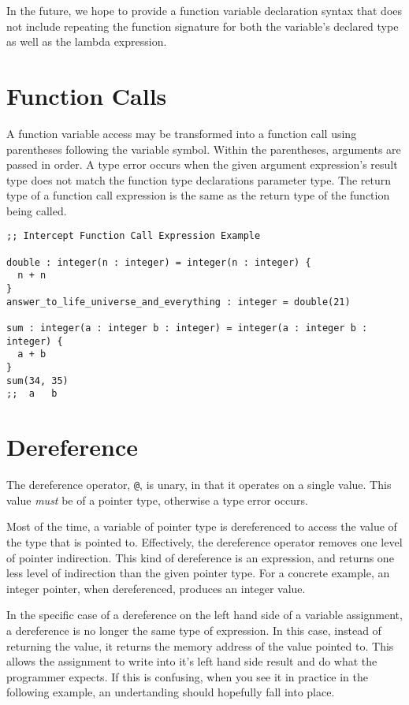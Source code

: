 \documentclass[12pt]{report}
\begin{document}
In the future, we hope to provide a function variable declaration syntax that does not include repeating the function signature for both the variable's declared type as well as the lambda expression.

\section{Function Calls}
\label{subsec:expressions-calls}

A function variable access may be transformed into a function call using parentheses following the variable symbol. Within the parentheses, arguments are passed in order. A type error occurs when the given argument expression's result type does not match the function type declarations parameter type. The return type of a function call expression is the same as the return type of the function being called.

\begin{Verbatim}[samepage=true]
;; Intercept Function Call Expression Example

double : integer(n : integer) = integer(n : integer) {
  n + n
}
answer_to_life_universe_and_everything : integer = double(21)

sum : integer(a : integer b : integer) = integer(a : integer b : integer) {
  a + b
}
sum(34, 35)
;;  a   b
\end{Verbatim}

\section{Dereference}
\label{subsec:expressions-dereference}

The dereference operator, \verb|@|, is unary, in that it operates on a single value. This value \emph{must} be of a pointer type, otherwise a type error occurs.

Most of the time, a variable of pointer type is dereferenced to access the value of the type that is pointed to. Effectively, the dereference operator removes one level of pointer indirection. This kind of dereference is an expression, and returns one less level of indirection than the given pointer type. For a concrete example, an integer pointer, when dereferenced, produces an integer value.

In the specific case of a dereference on the left hand side of a variable assignment, a dereference is no longer the same type of expression. In this case, instead of returning the value, it returns the memory address of the value pointed to. This allows the assignment to write into it's left hand side result and do what the programmer expects. If this is confusing, when you see it in practice in the following example, an undertanding should hopefully fall into place.
\end{document}

